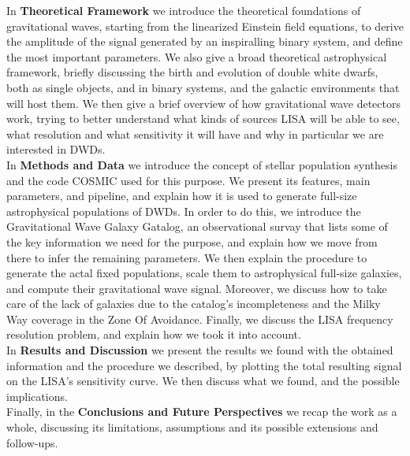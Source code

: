 In \textbf{Theoretical Framework} we introduce the theoretical foundations of gravitational waves, starting from the linearized Einstein field equations, to derive the amplitude of the signal generated by an inspiralling binary system, and define the most important parameters.
We also give a broad theoretical astrophysical framework, briefly discussing the birth and evolution of double white dwarfs, both as single objects, and in binary systems, and the galactic environments that will host them.
We then give a brief overview of how gravitational wave detectors work, trying to better understand what kinds of sources LISA will be able to see, what resolution and what sensitivity it will have and why in particular we are interested in DWDs.
\vspace{2mm}\\
In \textbf{Methods and Data} we introduce the concept of stellar population synthesis and the code COSMIC used for this purpose.
We present its features, main parameters, and pipeline, and explain how it is used to generate full-size astrophysical populations of DWDs.
In order to do this, we introduce the Gravitational Wave Galaxy Gatalog, an observational survay that lists some of the key information we need for the purpose, and explain how we move from there to infer the remaining parameters.
We then explain the procedure to generate the actal fixed populations, scale them to astrophysical full-size galaxies, and compute their gravitational wave signal. 
Moreover, we discuss how to take care of the lack of galaxies due to the catalog's incompleteness and the Milky Way coverage in the Zone Of Avoidance.
Finally, we discuss the LISA frequency resolution problem, and explain how we took it into account.\vspace{2mm}\\
In \textbf{Results and Discussion} we present the results we found with the obtained information and the procedure we described, by plotting the total resulting signal on the LISA's sensitivity curve.
We then discuss what we found, and the possible implications. \vspace{2mm}\\
Finally, in the \textbf{Conclusions and Future Perspectives} we recap the work as a whole, discussing its limitations, assumptions and its possible extensions and follow-ups.
